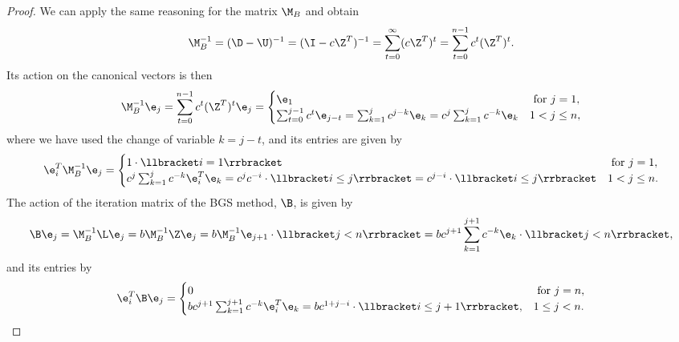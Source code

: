 \begin{proof}
We can apply the same reasoning for the matrix $\M_B$ and obtain
%
\begin{equation*}
\M_{B}^{-1} = (\D-\U)^{-1} = (\I-c\Z^T)^{-1} = \sum_{t=0}^{\infty}(c\Z^T)^{t} =
\sum_{t=0}^{n-1}c^t(\Z^T)^{t}.
\end{equation*}
Its action on the canonical vectors is then
%
\begin{equation*}
\M_{B}^{-1}\e_j = \sum_{t=0}^{n-1}c^t(\Z^T)^{t}\e_j =
\begin{cases}
\e_{1} &\mbox{ for } j=1, \\
\sum_{t=0}^{j-1} c^t\e_{j-t} = \sum_{k=1}^{j}
c^{j-k}\e_{k}=c^{j}\sum_{k=1}^{j}c^{-k}\e_{k} & 1< j\leq n,
\end{cases}
\end{equation*}
where we have used the change of variable $k=j-t$, and its entries are given by
%
\begin{equation*}
\e_i^T\M_{B}^{-1}\e_j =
\begin{cases}
1\cdot\llbracket i=1 \rrbracket &\mbox{ for } j=1, \\
c^{j}\sum_{k=1}^{j}c^{-k}\e_i^T\e_{k}=c^jc^{-i}\cdot\llbracket i\leq
j\rrbracket=c^{j-i}\cdot \llbracket i\leq j\rrbracket & 1< j\leq n.
\end{cases}
\end{equation*}
%
The action of the iteration matrix of the BGS method, $\B$, is given by
\begin{equation*}
\B\e_j=\M_B^{-1}\L\e_j=b\M_B^{-1}\Z\e_j=b\M_B^{-1}\e_{j+1}\cdot\llbracket j<n \rrbracket=
bc^{j+1}\sum_{k=1}^{j+1}c^{-k}\e_{k}\cdot\llbracket j< n\rrbracket,
\end{equation*}
and its entries by
%
\begin{equation*}
\e_i^T\B\e_j=
\begin{cases}
0 &\mbox{ for } j=n, \\
bc^{j+1}\sum_{k=1}^{j+1}c^{-k}\e_i^T\e_{k}= bc^{1+j-i}\cdot\llbracket i\leq
j+1\rrbracket, & 1\leq j< n.
\end{cases}
\end{equation*}
%


\end{proof}
